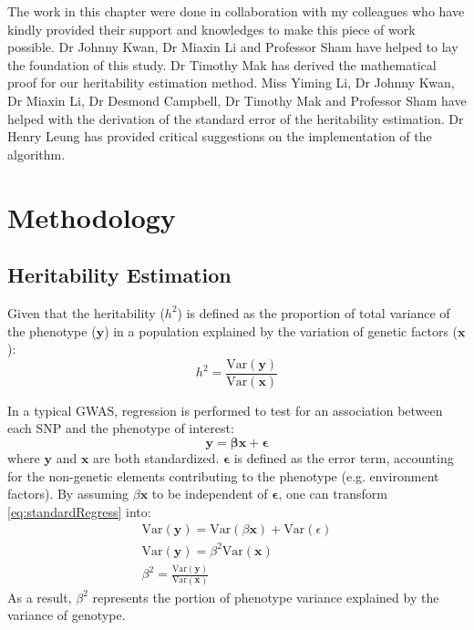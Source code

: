 	The work in this chapter were done in collaboration with my colleagues who have kindly provided their support and knowledges to make this piece of work possible.
	Dr Johnny Kwan, Dr Miaxin Li and Professor Sham have helped to lay the foundation of this study. 
	Dr Timothy Mak has derived the mathematical proof for our heritability estimation method. 
	Miss Yiming Li, Dr Johnny Kwan, Dr Miaxin Li, Dr Desmond Campbell, Dr Timothy Mak and Professor Sham have helped with the derivation of the standard error of the heritability estimation. 
	Dr Henry Leung has provided critical suggestions on the implementation of the algorithm.
	
	\section{Methodology}			
		\subsection{Heritability Estimation}
			Given that the heritability ($h^2$) is defined as the proportion of total variance of the phenotype ($\boldsymbol{y}$) in a population explained by the variation of genetic factors ($\boldsymbol{x}$):
			$$
				h^2 = \frac{\mathrm{Var}(\boldsymbol{y})}{\mathrm{Var}(\boldsymbol{x})}
			$$
			
			In a typical \gls{GWAS}, regression is performed to test for an association between each \gls{SNP} and the phenotype of interest:
			\begin{equation}
				\boldsymbol{y}=\boldsymbol{\beta x}+\boldsymbol{\epsilon}
				\label{eq:standardRegress}
			\end{equation}
			where $\boldsymbol{y}$ and $\boldsymbol{x}$ are both standardized.
			$\boldsymbol{\epsilon}$ is defined as the error term, accounting for the non-genetic elements contributing to the phenotype (e.g. environment factors).
			By assuming $\beta \boldsymbol{x}$ to be independent of $\boldsymbol{\epsilon}$, one can transform \cref{eq:standardRegress} into:
			\begin{align}
				\mathrm{Var}(\boldsymbol{y}) = \mathrm{Var}(\beta \boldsymbol{x})+ \mathrm{Var}(\epsilon) \nonumber\\
				\mathrm{Var}(\boldsymbol{y}) = \beta^2\mathrm{Var}(\boldsymbol{x}) \nonumber\\
				\beta^2= \frac{\mathrm{Var}(\boldsymbol{y})}{\mathrm{Var}(\boldsymbol{x})}
				\label{eq:betaHeri}
			\end{align}
			As a result, $\beta^2$ represents the portion of phenotype variance explained by the variance of genotype.
					
